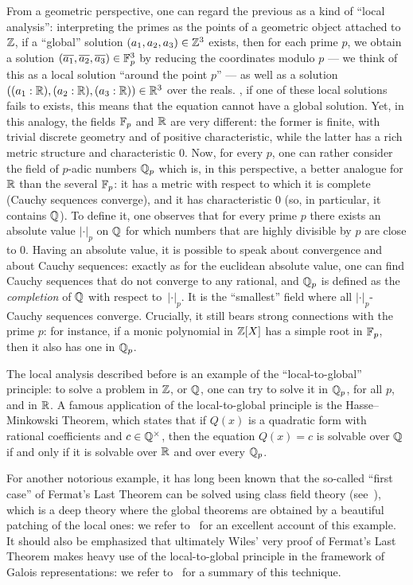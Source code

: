 \documentclass[sigplan,10pt, nonacm, review]{acmart}
\begin{document}
From a geometric perspective, one can regard the previous as a kind of ``local analysis'': interpreting the primes as the points of a geometric object attached to $\mathbb{Z}$, if a ``global'' solution $(a_1,a_2,a_3)\in\mathbb{Z}^3$ exists, then for each prime $p$, we obtain a solution $(\overline{a_1},\overline{a_2},\overline{a_3})\in\mathbb{F}_{p}^3$ by reducing the coordinates modulo $p$ --- we think of this as a local solution ``around the point $p$'' --- as well as a solution  $((a_1 : \mathbb{R}),(a_2 : \mathbb{R}),(a_3 : \mathbb{R}))\in\mathbb{R}^3$ over the reals. , if one of these local solutions fails to exists, this means that the equation cannot have a global solution. Yet, in this analogy, the fields $\mathbb{F}_{p}$ and $\mathbb{R}$ are very different: the former is finite, with trivial discrete geometry and of positive characteristic, while the latter has a rich metric structure and characteristic $0$. Now, for every $p$, one can rather consider the field of $p$-adic numbers $\mathbb{Q}_p$ which is, in this perspective, a better analogue for $\mathbb{R}$ than the several $\mathbb{F}_{p}$: it has a metric with respect to which it is complete (Cauchy sequences converge), and it has characteristic $0$ (so, in particular, it contains $\mathbb{Q}$). To define it, one observes that for every prime $p$ there exists an absolute value $\lvert\cdot\rvert_p$ on $\mathbb{Q}$ for which numbers that are highly divisible by $p$ are close to $0$. Having an absolute value, it is possible to speak about convergence and about Cauchy sequences: exactly as for the euclidean absolute value, one can find Cauchy sequences that do not converge to any rational, and $\mathbb{Q}_p$ is defined as the \emph{completion} of $\mathbb{Q}$ with respect to~$\lvert\cdot\rvert_p$. It is the ``smallest'' field where all $\lvert\cdot\rvert_p$-Cauchy sequences converge. Crucially, it still bears strong connections with the prime $p$: for instance, if a monic polynomial in $\mathbb{Z}[X]$ has a simple root in $\mathbb{F}_{p}$, then it also has one in $\mathbb{Q}_p$. 

The local analysis described before is an example of the ``local-to-global'' principle: to solve a problem in $\mathbb{Z}$, or $\mathbb{Q}$, one can try to solve it in $\mathbb{Q}_p$, for all $p$, and in $\mathbb{R}$. A famous application of the local-to-global principle is  the Hasse–Minkowski Theorem, which states that if $Q(x)$ is a quadratic form with rational coefficients and $c \in {\mathbb{Q}}^\times$, then the equation $Q(x) =c$ is solvable over $\mathbb{Q}$ if and only if it is solvable over $\mathbb{R}$ and over every $\mathbb{Q}_p$.

For another notorious example, it has long been known that the so-called ``first case'' of Fermat's Last Theorem can be solved using class field theory (see~\cite{LenSte97}), which is a deep theory where the global theorems are obtained by a beautiful patching of the local ones: we refer to \cite{Tat67}~for an excellent account of this example. It should also be emphasized that ultimately Wiles' very proof of Fermat's Last Theorem makes heavy use of the local-to-global principle in the framework of Galois representations: we refer to~\cite{Fre09} for a summary of this technique.
\end{document}
